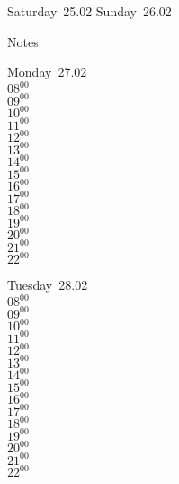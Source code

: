 \documentclass[11pt,a4paper]{book}\usepackage[]{graphicx}\usepackage[]{color}
\begin{document}
\begin{weekendbox}
  Saturday~25.02
  \tcblower
  Sunday~26.02
\end{weekendbox} %
\begin{notebox}
  Notes
\end{notebox}
\clearpage
\begin{headerbox}
\end{headerbox}
\begin{weekdaybox}
  Monday~27.02\\
  { 
  \vfill
  $08^{00}$\\
$09^{00}$\\
$10^{00}$\\
$11^{00}$\\
$12^{00}$\\
$13^{00}$\\
$14^{00}$\\
$15^{00}$\\
$16^{00}$\\
$17^{00}$\\
$18^{00}$\\
$19^{00}$\\
$20^{00}$\\
$21^{00}$\\
$22^{00}$\\
  }
\end{weekdaybox}
\begin{weekdaybox}
  Tuesday~28.02\\
  { 
  \vfill
  $08^{00}$\\
$09^{00}$\\
$10^{00}$\\
$11^{00}$\\
$12^{00}$\\
$13^{00}$\\
$14^{00}$\\
$15^{00}$\\
$16^{00}$\\
$17^{00}$\\
$18^{00}$\\
$19^{00}$\\
$20^{00}$\\
$21^{00}$\\
$22^{00}$\\
  }
\end{weekdaybox}
\end{document}
